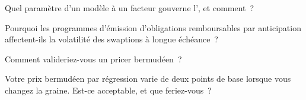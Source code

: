 \begin{interviewq}\label{iq:rc:bermudans-and-callables:3}
Quel paramètre d'un modèle à un facteur gouverne l', et comment~?
\end{interviewq}

\begin{interviewq}\label{iq:rc:bermudans-and-callables:4}
Pourquoi les programmes d'émission d'obligations remboursables par anticipation affectent-ils la volatilité des swaptions à longue échéance~?
\end{interviewq}

\begin{interviewq}\label{iq:rc:bermudans-and-callables:5}
Comment valideriez-vous un pricer bermudéen~?
\end{interviewq}

\begin{interviewq}\label{iq:rc:bermudans-and-callables:6}
Votre prix bermudéen par régression varie de deux points de base lorsque vous changez la
graine. Est-ce acceptable, et que feriez-vous~?
\end{interviewq}
